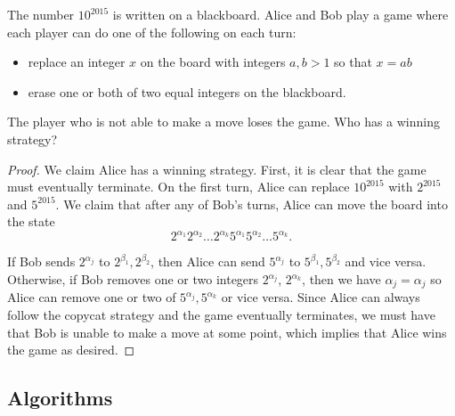 \documentclass[11pt]{article}
\renewcommand{\>}{\rangle}
\newcommand{\<}{\langle}
\begin{document}
\begin{problem} The number $10^{2015}$ is written on a blackboard.  Alice and Bob play a game where each player can do one of the following on each turn:
\begin{itemize}
\item replace an integer $x$ on the board with integers $a, b > 1$ so that $x = ab$
\item erase one or both of two equal integers on the blackboard.  
\end{itemize}
The player who is not able to make a move loses the game.  Who has a winning strategy?
\end{problem}
\begin{proof}
We claim Alice has a winning strategy.  First, it is clear that the game must eventually terminate.  On the first turn, Alice can replace $10^{2015}$ with $2^{2015}$ and $5^{2015}$.  We claim that after any of Bob's turns, Alice can move the board into the state 
$$2^{\alpha_1} 2^{\alpha_2} \dots 2^{\alpha_k} 5^{\alpha_1} 5^{\alpha_2} \dots 5^{\alpha_k}.$$

If Bob sends $2^{\alpha_j}$ to $2^{\beta_1} ,2^{\beta_2}$, then Alice can send $5^{\alpha_j}$ to $5^{\beta_1} , 5^{\beta_2}$ and vice versa.  Otherwise, if Bob removes one or two integers $2^{\alpha_j}$, $2^{\alpha_k}$, then we have $\alpha_j = \alpha_j$ so Alice can remove one or two of $5^{\alpha_j}, 5^{\alpha_k}$ or vice versa.  Since Alice can always follow the copycat strategy and the game eventually terminates, we must have that Bob is unable to make a move at some point, which implies that Alice wins the game as desired.   
\end{proof}

\subsection{Algorithms}
\end{document}
